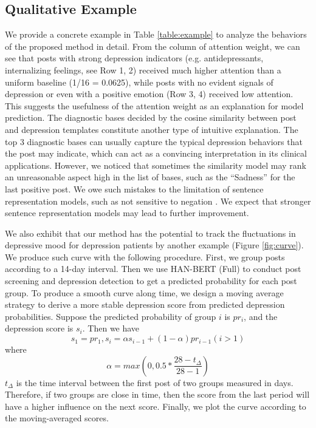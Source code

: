 \subsection{Qualitative Example}

We provide a concrete example in Table \ref{table:example} to analyze the behaviors of the proposed method in detail. From the column of attention weight, we can see that posts with strong depression indicators (e.g. antidepressants, internalizing feelings, see Row 1, 2) received much higher attention than a uniform baseline (1/16 = 0.0625), while posts with no evident signals of depression or even with a positive emotion (Row 3, 4) received low attention. This suggests the usefulness of the attention weight as an explanation for model prediction. The diagnostic bases decided by the cosine similarity between post and depression templates constitute another type of intuitive explanation. The top 3 diagnostic bases can usually capture the typical depression behaviors that the post may indicate, which can act as a convincing interpretation in its clinical applications. However, we noticed that sometimes the similarity model may rank an unreasonable aspect high in the list of bases, such as the ``Sadness'' for the last positive post. We owe such mistakes to the limitation of sentence representation models, such as not sensitive to negation \citep{ribeiro2020beyond}. We expect that stronger sentence representation models may lead to further improvement.

We also exhibit that our method has the potential to track the fluctuations in depressive mood for depression patients by another example (Figure \ref{fig:curve}). We produce such curve with the following procedure. First, we group posts according to a 14-day interval. Then we use HAN-BERT (Full) to conduct post screening and depression detection to get a predicted probability for each post group. To produce a smooth curve along time, we design a moving average strategy to derive a more stable depression score from predicted depression probabilities. Suppose the predicted probability of group $i$ is $pr_i$, and the depression score is $s_i$. Then we have 
$$s_1 = pr_1, s_i = \alpha s_{i-1} + (1-\alpha) pr_{i-1} (i > 1)$$
where 
$$\alpha = max(0, 0.5 * \frac{28-t_{\Delta}}{28-1})$$
$t_{\Delta}$ is the time interval between the first post of two groups measured in days. Therefore, if two groups are close in time, then the score from the last period will have a higher influence on the next score. Finally, we plot the curve according to the moving-averaged scores.

